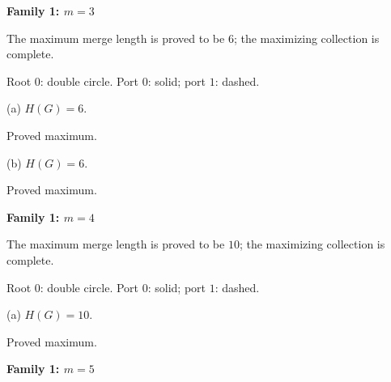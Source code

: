 \documentclass[10pt,a4paper]{article}
\begin{document}
\par\vspace{2.5mm}
\clearpage
{\Large\bfseries Family 1: $m=3$}\par
\vspace{2mm}
{\small The maximum merge length is proved to be $6$; the maximizing collection is complete.}\par
\vspace{1mm}
{\small Root $0$: double circle. Port $0$: solid; port $1$: dashed.}\par
\vspace{3mm}
\noindent\hfill
\begin{minipage}[t]{.48\textwidth}\centering
\resizebox{8.2cm}{!}{}\par
{\footnotesize (a) $H(G)=6$.\par Proved maximum.}\par
\end{minipage}\hfill
\begin{minipage}[t]{.48\textwidth}\centering
\resizebox{8.2cm}{!}{}\par
{\footnotesize (b) $H(G)=6$.\par Proved maximum.}\par
\end{minipage}\hfill
\par\vspace{2.5mm}
\clearpage
{\Large\bfseries Family 1: $m=4$}\par
\vspace{2mm}
{\small The maximum merge length is proved to be $10$; the maximizing collection is complete.}\par
\vspace{1mm}
{\small Root $0$: double circle. Port $0$: solid; port $1$: dashed.}\par
\vspace{3mm}
\noindent\hfill
\begin{minipage}[t]{.96\textwidth}\centering
\resizebox{9cm}{!}{}\par
{\footnotesize (a) $H(G)=10$.\par Proved maximum.}\par
\end{minipage}\hfill
\par\vspace{2.5mm}
\clearpage
{\Large\bfseries Family 1: $m=5$}\par
\vspace{2mm}
\end{document}
